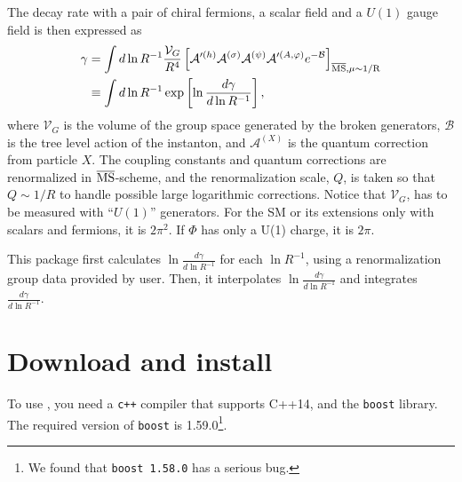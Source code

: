 \documentclass[12pt]{article}
\begin{document}
The decay rate with a pair of chiral fermions, a scalar field and a
$U(1)$ gauge field is then expressed as
\begin{align}
 \gamma &=
 \int d\ln R^{-1}\frac{\mathcal V_G}{R^4}
 \left[
  \mathcal A'^{(h)}\mathcal A^{(\sigma)}\mathcal A^{(\psi)}
  \mathcal A'^{(A,\varphi)} e^{-\mathcal B}
 \right]_{\rm \overline{MS},\mu\sim1/R}\nonumber\\
 &\equiv
 \int d\ln R^{-1}\exp
 \left[
  \ln\frac{d\gamma}{d\ln R^{-1}}
 \right],
\end{align}
where $\mathcal V_G$ is the volume of the group space generated by the
broken generators, $\mathcal B$ is the tree level action of the
instanton, and $\mathcal A^{(X)}$ is the quantum correction from
particle $X$. The coupling constants and quantum corrections are
renormalized in $\rm \overline{MS}$-scheme, and the renormalization
scale, $Q$, is taken so that $Q\sim 1/R$ to handle possible large
logarithmic corrections.  Notice that $\mathcal V_G$, has to be measured
with ``$U(1)$'' generators. For the SM or its extensions only with
scalars and fermions, it is $2\pi^2$. If $\Phi$ has only a U(1)
charge, it is $2\pi$.

This package first calculates $\ln\frac{d\gamma}{d\ln R^{-1}}$ for each
$\ln R^{-1}$, using a renormalization group data provided by user.  Then,
it interpolates $\ln\frac{d\gamma}{d\ln R^{-1}}$ and integrates
$\frac{d\gamma}{d\ln R^{-1}}$.
\section{Download and install}
To use \codename, you need a
\verb|c++| compiler that supports C++14, and the \verb|boost| library.
The required version of \verb|boost| is 1.59.0\footnote{We found that {\tt boost 1.58.0} has a serious bug.}. 
\end{document}

